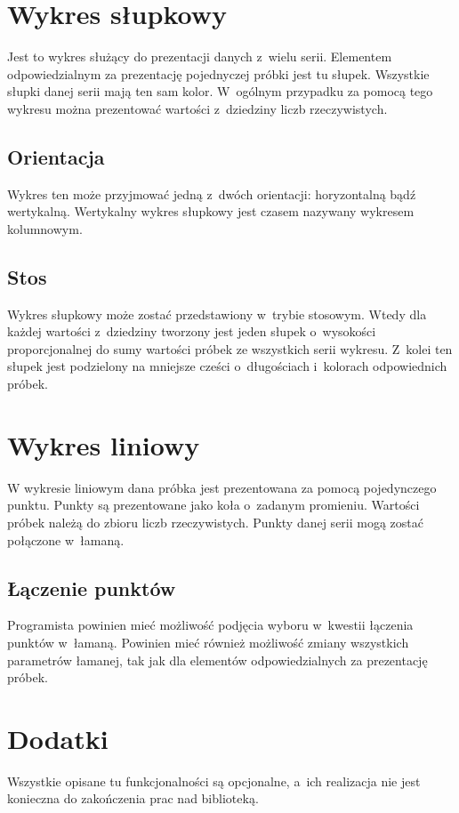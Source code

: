 \section{Wykres słupkowy}
Jest to wykres służący do prezentacji danych z~wielu serii. Elementem odpowiedzialnym za prezentację pojednyczej próbki jest tu słupek. Wszystkie słupki danej serii mają ten sam kolor. W~ogólnym przypadku za pomocą tego wykresu można prezentować wartości z~dziedziny liczb rzeczywistych.

\subsection{Orientacja} 
Wykres ten może przyjmować jedną z~dwóch orientacji: horyzontalną bądź wertykalną. Wertykalny wykres słupkowy jest czasem nazywany wykresem kolumnowym. 

\subsection{Stos}
Wykres słupkowy może zostać przedstawiony w~trybie stosowym. Wtedy dla każdej wartości z~dziedziny tworzony jest jeden słupek o~wysokości proporcjonalnej do sumy wartości próbek ze wszystkich serii wykresu. Z~kolei ten słupek jest podzielony na mniejsze cześci o~długościach i~kolorach odpowiednich próbek.  


\section{Wykres liniowy}
W wykresie liniowym dana próbka jest prezentowana za pomocą pojedynczego punktu. Punkty są prezentowane jako koła o~zadanym promieniu. Wartości próbek należą do zbioru liczb rzeczywistych. Punkty danej serii mogą zostać połączone w~łamaną.

\subsection{Łączenie punktów}
Programista powinien mieć możliwość podjęcia wyboru w~kwestii łączenia punktów w~łamaną. Powinien mieć również możliwość zmiany wszystkich parametrów łamanej, tak jak dla elementów odpowiedzialnych za prezentację próbek.

\section{Dodatki}
Wszystkie opisane tu funkcjonalności są opcjonalne, a~ich realizacja nie jest konieczna do zakończenia prac nad biblioteką.

